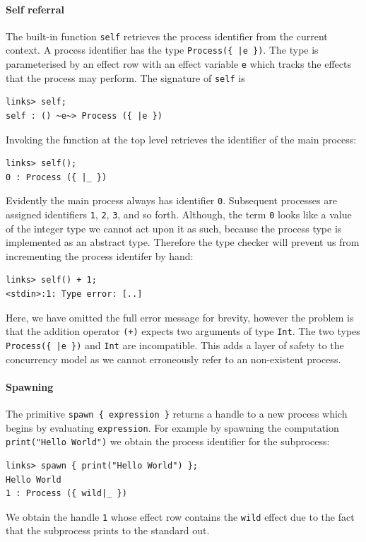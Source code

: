 \documentclass[12pt,mscres,cdtppar,twoside,openright,logo,rightchapter,normalheadings]{infthesis}
\theoremstyle{definition}
\begin{document}
\paragraph{Self referral} The built-in function \lstinline$self$
retrieves the process identifier from the current context. A process
identifier has the type \lstinline$Process({ |e })$. The type is
parameterised by an effect row with an effect variable \lstinline$e$
which tracks the effects that the process may perform. The signature
of \lstinline$self$ is
\begin{lstlisting}
links> self;
self : () ~e~> Process ({ |e })
\end{lstlisting}
%
Invoking the function at the top level retrieves the identifier of the
main process:
%
\begin{lstlisting}
links> self();
0 : Process ({ |_ })
\end{lstlisting}
%
Evidently the main process always has identifier
\lstinline$0$. Subsequent processes are assigned identifiers
\lstinline$1$, \lstinline$2$, \lstinline$3$, and so forth. Although, the term
\lstinline$0$ looks like a value of the integer type we cannot act
upon it as such, because the process type is implemented as an
abstract type. Therefore the type checker will prevent us from
incrementing the process identifer by hand:
%
\begin{lstlisting}
links> self() + 1;
<stdin>:1: Type error: [..]
\end{lstlisting}
%
Here, we have omitted the full error message for brevity, however the
problem is that the addition operator \lstinline$(+)$ expects two
arguments of type \lstinline$Int$. The two types
\lstinline$Process({ |e })$ and \lstinline$Int$ are incompatible. This
adds a layer of safety to the concurrency model as we cannot
erroneously refer to an non-existent process.
%

\paragraph{Spawning} The primitive \lstinline$spawn { expression }$
returns a handle to a new process which begins by evaluating
\lstinline$expression$. For example by spawning the computation
\lstinline$print("Hello World")$ we obtain the process identifier for the subprocess:
%
\begin{lstlisting}
links> spawn { print("Hello World") };
Hello World
1 : Process ({ wild|_ })
\end{lstlisting}
%
We obtain the handle \lstinline$1$ whose effect row contains the
\lstinline$wild$ effect due to the fact that the subprocess prints to
the standard out.
\end{document}
